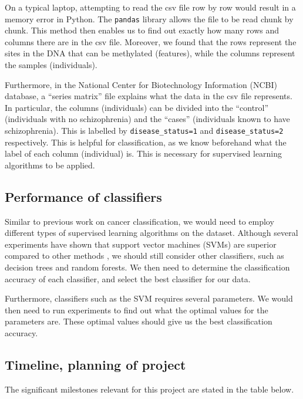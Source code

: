 \documentclass[12pt, twoside, a4paper]{article}
\begin{document}
On a typical laptop, attempting to read the csv file row by row would result in a memory error in Python. The \texttt{pandas} library allows the file to be read chunk by chunk. This method then enables us to find out exactly how many rows and columns there are in the csv file. Moreover, we found that the rows represent the sites in the DNA that can be methylated (features), while the columns represent the samples (individuals).

Furthermore, in the National Center for Biotechnology Information (NCBI) database, a ``series matrix'' file  explains what the data in the csv file represents. In particular, the columns (individuals) can be divided into the ``control'' (individuals with no schizophrenia) and the ``cases'' (individuals known to have schizophrenia). This is labelled by \texttt{disease\_status=1} and \texttt{disease\_status=2} respectively. This is helpful for classification, as we know beforehand what the label of each column (individual) is. This is necessary for supervised learning algorithms to be applied.

\subsection{Performance of classifiers}
Similar to previous work on cancer classification, we would need to employ different types of supervised learning algorithms on the dataset. Although several experiments have shown that support vector machines (SVMs) are superior compared to other methods \cite{RefWorks:90}, we should still consider other classifiers, such as decision trees and random forests. We then need to determine the classification accuracy of each classifier, and select the best classifier for our data.

Furthermore, classifiers such as the SVM requires several parameters. We would then need to run experiments to find out what the optimal values for the parameters are. These optimal values should give us the best classification accuracy.


\subsection{Timeline, planning of project}

The significant milestones relevant for this project are stated in the table below.
\end{document}

